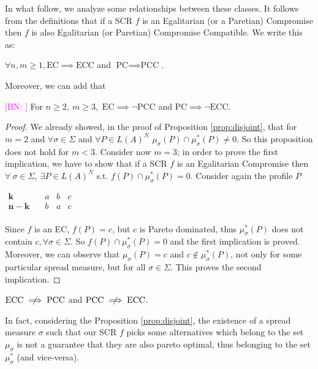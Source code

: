\documentclass[version=3.21, pagesize, notitlepage, twoside=off, bibliography=totoc, DIV=calc, fontsize=12pt, a4paper]{scrartcl}
\newcommand{\commentBN}[1]{\textcolor{magenta}{\small$\big[$BN: #1$\big]$}}
\newcommand{\musigma}{\mu_{\sigma}}
\newcommand{\mustar}{\mu_{\sigma}^*}
\begin{document}
In what follow, we analyze some relationships between these classes. It follows from the definitions that if a SCR $f$ is an Egalitarian (or a Paretian) Compromise then $f$ is also Egalitarian (or Paretian) Compromise Compatible. We write this as:
\begin{proposition}
	$\forall n, m ≥ 1, \text{EC} \implies \text{ECC}$ and $\text{PC} \implies \text{PCC}$.
\end{proposition}

Moreover, we can add that
\begin{proposition}
	 \commentBN{}
	{\color{magenta} For $n\geq 2, \ m\geq3,$} 
	$\text{EC} \implies \lnot \text{PCC}$ and $\text{PC} \implies \lnot \text{ECC}$.
\end{proposition}
\begin{proof}
	We already showed, in the proof of Proposition \ref{prop:disjoint}, that for $m=2$ and $\forall \sigma \in \Sigma$ and $\forall P \in L(A)^N$ $\musigma(P) \cap \mustar(P) \neq 0$. So this proposition does not hold for $m<3$.
	Consider now $m=3$; in order to prove the first implication, we have to show that if a SCR $f$ is an Egalitarian Compromise then $\forall \ \sigma \in \Sigma , \ \exists P \in L(A)^N  \text{ s.t. }f(P) \cap \mustar(P) = 0$. Consider again the profile $P$
	\begin{center}
		$
		\begin{array}{cccc}
		\mathbf{k} \quad &a&b&c\\
		\mathbf{n-k} \quad &b&a&c\\
		\end{array}
		$
	\end{center}
	Since $f$ is an EC, $f(P)={c}$, but $c$ is Pareto dominated, thus $\mu_{\sigma}^*(P)$ does not contain ${c}, \forall \sigma \in \Sigma$. So $f(P) \cap \mustar(P) = 0$ and the first implication is proved. Moreover, we can observe that $\musigma(P)={c}$ and $c \notin \mustar(P)$, not only for some particular spread measure, but for all $\sigma \in \Sigma$. This proves the second implication.
\end{proof}


\begin{proposition}
	$\text{ECC} \centernot \implies \text{PCC}$ and $\text{PCC} \centernot \implies \text{ECC}$.
\end{proposition}
 In fact, considering the Proposition \ref{prop:disjoint}, the existence of a spread measure $\sigma$ such that our SCR $f$ picks some alternatives which belong to the set $\musigma$ is not a guarantee that they are also pareto optimal, thus belonging to the set $\mustar$ (and vice-versa).
\end{document}
